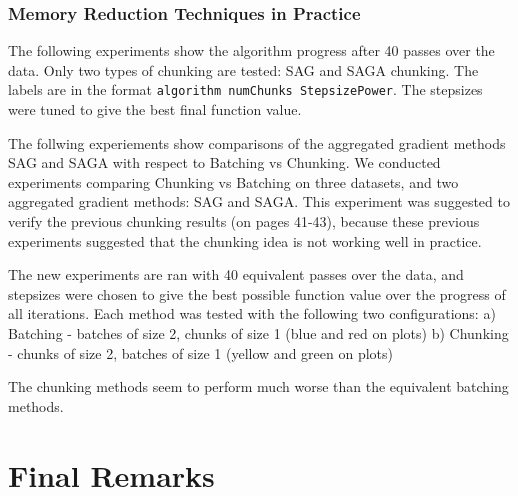 \documentclass[11pt]{article}
\begin{document}
   \subsubsection{Memory Reduction Techniques in Practice}
   
   The following experiments show the algorithm progress after 40 passes over the data. Only two types of chunking are tested: SAG and SAGA chunking. The labels are in the format \texttt{algorithm numChunks StepsizePower}. The stepsizes were tuned to give the best final function value. 
   
   The follwing experiements show comparisons of the aggregated gradient methods SAG and SAGA with respect to Batching vs Chunking. We conducted experiments comparing Chunking vs Batching on three datasets, and two aggregated gradient methods: SAG and SAGA. This experiment was suggested to verify the previous chunking results (on pages 41-43), because these previous experiments suggested that the chunking idea is not working well in practice. 

   The new experiments are ran with 40 equivalent passes over the data, and stepsizes were chosen to give the best possible function value over the progress of all iterations. Each method was tested with the following two configurations:
   a) Batching - batches of size 2, chunks of size 1  (blue and red on plots)
   b) Chunking - chunks of size 2, batches of size 1 (yellow and green on plots)

   The chunking methods seem to perform much worse than the equivalent batching methods.

\section{Final Remarks} \label{finalr}


 \small 



\end{document}
